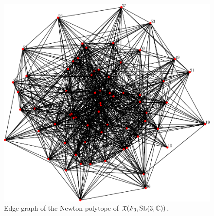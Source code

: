 \documentclass[11pt]{article}
\begin{document}
\begin{figure}[h]
  \centering
  \includegraphics[scale=.55]{biggraph}
  \caption{Edge graph of the Newton polytope of
    $\mathfrak{X}(F_3,\mathrm{SL}(3,\mathbb{C}))$.}
\label{fig:f3-sl3c}
\end{figure}
\end{document}
